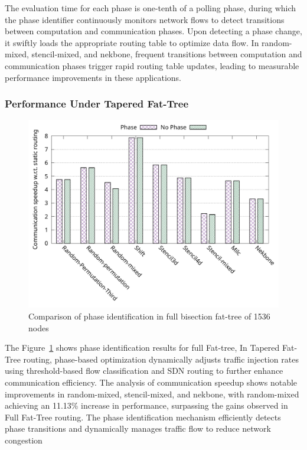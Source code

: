 The evaluation time for each phase is one-tenth of a polling phase, during which the phase identifier continuously monitors network flows to detect transitions between computation and communication phases. Upon detecting a phase change, it swiftly loads the appropriate routing table to optimize data flow. In random-mixed, stencil-mixed, and nekbone, frequent transitions between computation and communication phases trigger rapid routing table updates, leading to measurable performance improvements in these applications.


\subsubsection{Performance Under Tapered Fat-Tree}
\begin{figure}[h]
  \centering
  \includegraphics[width=\columnwidth]{./figs_4/phase_taper.pdf}
  \caption{Comparison of phase identification in full bisection fat-tree of 1536 nodes}
  \label{fig:phase_taper}
\end{figure}
The Figure~\ref{fig:phase_taper} shows phase identification results for full Fat-tree,
In Tapered Fat-Tree routing, phase-based optimization dynamically adjusts traffic injection rates using threshold-based flow classification and SDN routing to further enhance communication efficiency. The analysis of communication speedup shows notable improvements in random-mixed, stencil-mixed, and nekbone, with random-mixed achieving an 11.13\% increase in performance, surpassing the gains observed in Full Fat-Tree routing. The phase identification mechanism efficiently detects phase transitions and dynamically manages traffic flow to reduce network congestion

